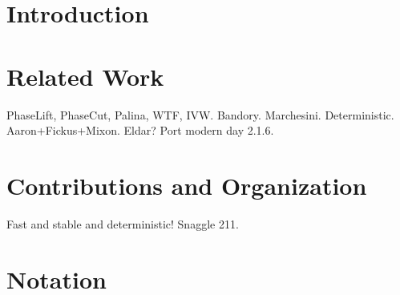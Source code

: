 \section{Introduction}

\section{Related Work}
PhaseLift, PhaseCut, Palina, WTF, IVW.  Bandory.  Marchesini.  Deterministic.  Aaron+Fickus+Mixon.  Eldar?  Port modern day 2.1.6.
\section{Contributions and Organization}
Fast and stable and deterministic!  Snaggle 211.
\section{Notation}
\label{sec:notation}

